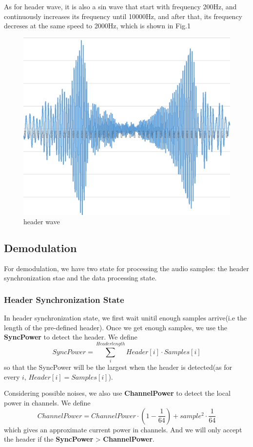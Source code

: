 \documentclass[11pt, conference]{IEEEtran}
\begin{document}
As for header wave, it is also a sin wave that start with frequency 200Hz, and continuously increases its frequency until 10000Hz, and after that, its
frequency decreses at the same speed to 2000Hz, which is shown in Fig.1

\begin{figure}[!h]
	\centering
	\includegraphics[scale=0.4]{header_wave.png}
	\caption{header wave}\label{}
	\end{figure}

\subsection{{Demodulation}}
    For demodulation, we have two state for processing the audio samples: the header synchronization stae and the data processing state.
\subsubsection{Header Synchronization State}
    In header synchronization state, we first wait unitil enough samples arrive(i.e the length of the pre-defined header). Once we get enough samples, we use the \textbf{SyncPower}
    to detect the header. We define $$SyncPower = \sum_{i}^{Headerlength} Header[i] \cdot Samples[i]$$
    so that the SyncPower will be the largest when the header is detected(as for every $i$, $Header[i] = Samples[i]$).

    Considering possible noises, we also use \textbf{ChannelPower} to detect the local power in channels. We define
    $$ChannelPower = ChannelPower\cdot (1 - \frac{1}{64}) + sample^2 \cdot \frac{1}{64}$$
    which gives an approximate current power in channels. And we will only accept the header if the \textbf{SyncPower} > \textbf{ChannelPower}.
\end{document}
